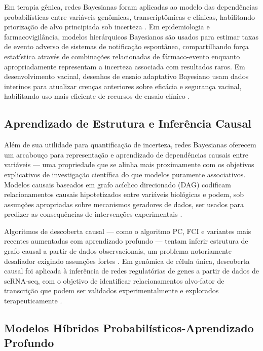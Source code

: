 Em terapia gênica, redes Bayesianas foram aplicadas ao modelo das dependências probabilísticas entre variáveis genômicas, transcriptômicas e clínicas, habilitando priorização de alvo principiada sob incerteza \parencite{danaeifar2025}. Em epidemiologia e farmacovigilância, modelos hierárquicos Bayesianos são usados para estimar taxas de evento adverso de sistemas de notificação espontânea, compartilhando força estatística através de combinações relacionadas de fármaco-evento enquanto apropriadamente representam a incerteza associada com resultados raros. Em desenvolvimento vacinal, desenhos de ensaio adaptativo Bayesiano usam dados interinos para atualizar crenças anteriores sobre eficácia e segurança vacinal, habilitando uso mais eficiente de recursos de ensaio clínico \parencite{berry2010}.

\subsection{Aprendizado de Estrutura e Inferência Causal}

Além de sua utilidade para quantificação de incerteza, redes Bayesianas oferecem um arcabouço para representação e aprendizado de dependências causais entre variáveis --- uma propriedade que se alinha mais proximamente com os objetivos explicativos de investigação científica do que modelos puramente associativos. Modelos causais baseados em grafo acíclico direcionado (DAG) codificam relacionamentos causais hipotetizados entre variáveis biológicas e podem, sob assunções apropriadas sobre mecanismos geradores de dados, ser usados para predizer as consequências de intervenções experimentais \parencite{pearl2009}.

Algoritmos de descoberta causal --- como o algoritmo PC, FCI e variantes mais recentes aumentadas com aprendizado profundo --- tentam inferir estrutura de grafo causal a partir de dados observacionais, um problema notoriamente desafiador exigindo assunções fortes \parencite{spirtes2000}. Em genômica de célula única, descoberta causal foi aplicada à inferência de redes regulatórias de genes a partir de dados de scRNA-seq, com o objetivo de identificar relacionamentos alvo-fator de transcrição que podem ser validados experimentalmente e explorados terapeuticamente \parencite{skokgibbs2022}.

\subsection{Modelos Híbridos Probabilísticos-Aprendizado Profundo}

